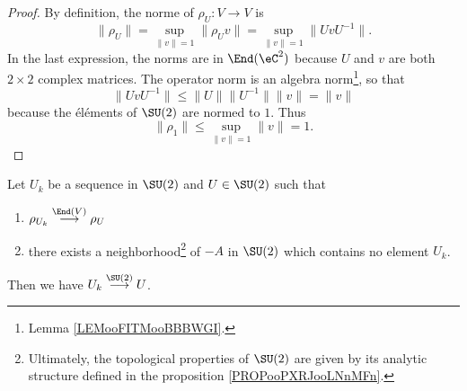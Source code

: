 \begin{proof}
	By definition, the norme of \( \rho_U\colon V\to V\) is
	\begin{equation}
		\| \rho_U \|=\sup_{\| v \|=1}\| \rho_Uv \|=\sup_{\| v \|=1}\| UvU^{-1} \|.
	\end{equation}
	In the last expression, the norms are in \( \End(\eC^2)\) because \( U\) and \( v\) are both \( 2\times 2\) complex matrices. The operator norm is an algebra norm\footnote{Lemma \ref{LEMooFITMooBBBWGI}.}, so that
	\begin{equation}
		\| UvU^{-1} \|\leq \| U \|\| U^{-1} \|\| v \|=\| v \|
	\end{equation}
	because the éléments of \( \SU(2)\) are normed to \( 1\). Thus
	\begin{equation}
		\| \rho_1 \|\leq \sup_{\| v \|=1}\| v \|=1.
	\end{equation}
\end{proof}

\begin{lemma}       \label{LEMooHPQQooIGwljm}
	Let \( U_k\) be a sequence in \(\SU(2)\) and \( U\in \SU(2)\) such that
	\begin{enumerate}
		\item
		      \( \rho_{U_k}\stackrel{\End(V)}{\longrightarrow}\rho_U\)
		\item
		      there exists a neighborhood\footnote{Ultimately, the topological properties of $ \SU(2)$ are given by its analytic structure defined in the proposition \ref{PROPooPXRJooLNnMFn}.} of \( -A\) in \( \SU(2)\) which contains no element \( U_k\).
	\end{enumerate}
	Then we have \( U_k\stackrel{\SU(2)}{\longrightarrow}U\).
\end{lemma}


